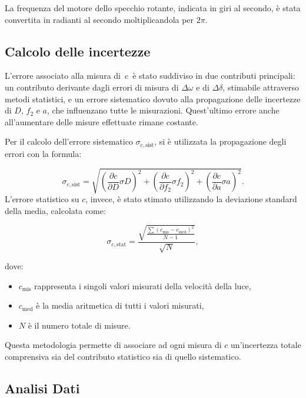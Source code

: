 \documentclass{article}
\begin{document}
La frequenza del motore dello specchio rotante, indicata in giri al secondo, è stata convertita in radianti al secondo moltiplicandola per $2 \pi$.


\subsection{Calcolo delle incertezze}

L’errore associato alla misura di c è stato suddiviso in due contributi principali: un contributo derivante dagli errori di misura di \textbf{\(\Delta \omega\)} e di \textbf{\(\Delta \delta\)}, stimabile attraverso metodi statistici, e un errore sistematico dovuto alla propagazione delle incertezze di \(D\), \(f_2\) e \(a\), che influenzano tutte le misurazioni. Quest’ultimo errore anche all’aumentare delle misure effettuate rimane costante.


Per il calcolo dell'errore sistematico $\sigma_{c,\text{sist}}$, si è utilizzata la propagazione degli errori con la formula:

\begin{equation}
\sigma_{c,\text{sist}} = \sqrt{\left(\frac{\partial c}{\partial D} \sigma D\right)^2 + \left(\frac{\partial c}{\partial f_2} \sigma f_2\right)^2 + \left(\frac{\partial c}{\partial a} \sigma a\right)^2}.
\end{equation}
L'errore statistico su $c$, invece, è stato stimato utilizzando la deviazione standard della media, calcolata come:

\begin{equation}
\sigma_{c,\text{stat}} = \frac{\sqrt{\frac{\sum (c_{\text{mis}} - c_{\text{med}})^2}{N-1}}}{\sqrt{N}},
\end{equation}

dove:
\begin{itemize}
    \item $c_{\text{mis}}$ rappresenta i singoli valori misurati della velocità della luce,
    \item $c_{\text{med}}$ è la media aritmetica di tutti i valori misurati,
    \item $N$ è il numero totale di misure.
\end{itemize}

Questa metodologia permette di associare ad ogni misura di \(c\) un'incertezza totale comprensiva sia del contributo statistico sia di quello sistematico.

\subsection{Analisi Dati}
\end{document}

